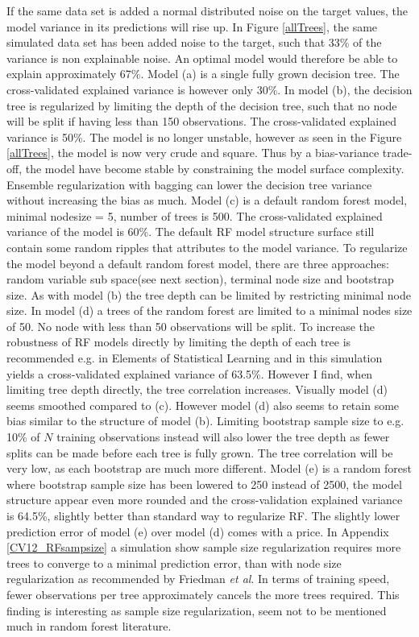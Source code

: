 If the same data set is added a normal distributed noise on the target values, the model variance in its predictions will rise up. In Figure \ref{allTrees}, the same simulated data set has been added noise to the target, such that 33\% of the variance is non explainable noise. An optimal model would therefore be able to explain approximately 67\%. Model (a) is a single fully grown decision tree. The cross-validated explained variance is however only 30\%. In model (b), the decision tree is regularized by limiting the depth of the decision tree, such that no node will be split if having less than 150 observations. The cross-validated explained variance is 50\%. The model is no longer unstable, however as seen in the Figure \ref{allTrees}, the model is now very crude and square. Thus by a bias-variance trade-off, the model have become stable by constraining the model surface complexity. Ensemble regularization with bagging can lower the decision tree variance without increasing the bias as much.  Model (c) is a default random forest model, minimal nodesize = 5, number of trees is 500. The cross-validated explained variance of the model is 60\%. The default RF model structure surface still contain some random ripples that attributes to the model variance. To regularize the model beyond a default random forest model, there are three approaches: random variable sub space(see next section), terminal node size and bootstrap size. As with model (b) the tree depth can be limited by restricting minimal node size. In model (d) a trees of the random forest are limited to a minimal nodes size of 50. No node with less than 50 observations will be split. To increase the robustness of RF models directly by limiting the depth of each tree is recommended e.g. in Elements of Statistical Learning \cite{friedman2001elements} and in this simulation yields a cross-validated explained variance of 63.5\%. However I find, when limiting tree depth directly, the tree correlation increases. Visually model (d) seems smoothed compared to (c). However model (d) also seems to retain some bias similar to the structure of model (b). Limiting bootstrap sample size to e.g. 10\% of $N$ training observations instead will also lower the tree depth as fewer splits can be made before each tree is fully grown. The tree correlation will be very low, as each bootstrap are much more different. Model (e) is a random forest where bootstrap sample size has been lowered to 250 instead of 2500, the model structure appear even more rounded and the cross-validation explained variance is 64.5\%, slightly better than standard way to regularize RF. The slightly lower prediction error of model (e) over model (d) comes with a price. In Appendix \ref{CV12_RFsampsize} a simulation show sample size regularization requires more trees to converge to a minimal prediction error, than with node size regularization as recommended by Friedman \textit{et al}. In terms of training speed, fewer observations per tree approximately cancels the more trees required. This finding is interesting as sample size regularization, seem not to be mentioned much in random forest literature.


